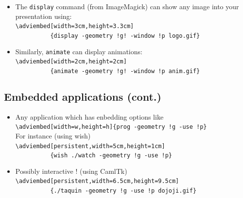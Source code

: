 \documentclass[12pt]{article}
\begin{document}
\begin{itemize}
\item The \verb"display" command (from ImageMagick) can show any image into your
presentation using:\\
\verb|\adviembed[width=3cm,height=3.3cm]|\\
\verb|          {display -geometry !g! -window !p logo.gif}|\\

\item Similarly, \verb|animate| can display animations:\\
        \verb|\adviembed[width=2cm,height=2cm]|\\
        \verb|          {animate -geometry !g! -window !p anim.gif}|\\
\end{itemize}

% 
% 

\newpage

\subsection* {Embedded applications (cont.)}

\begin{itemize}
  \item Any application which has enbedding options like\\
   \verb+\adviembed[width=w,height=h]{prog -geometry !g -use !p}+\\
   For instance (using wish)\\
   \verb|\adviembed[persistent,width=5cm,height=1cm]|\\
   \verb|          {wish ./watch -geometry !g -use !p}|\\
\adviwait
  \item Possibly interactive ! (using CamlTk)\\
   \verb|\adviembed[persistent,width=6.5cm,height=9.5cm]|\\
   \verb|          {./taquin -geometry !g -use !p dojoji.gif}|\\

\end{itemize}
\end{document}
